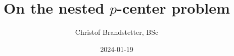 \documentclass[utf8,aspectratio=169,ngerman,english]{beamer}
\begin{document}


\title{On the nested $p$-center problem}



\author{Christof Brandstetter, BSc}



\date{2024-01-19}


\footer{\insertshorttitle}        %


\end{document}
